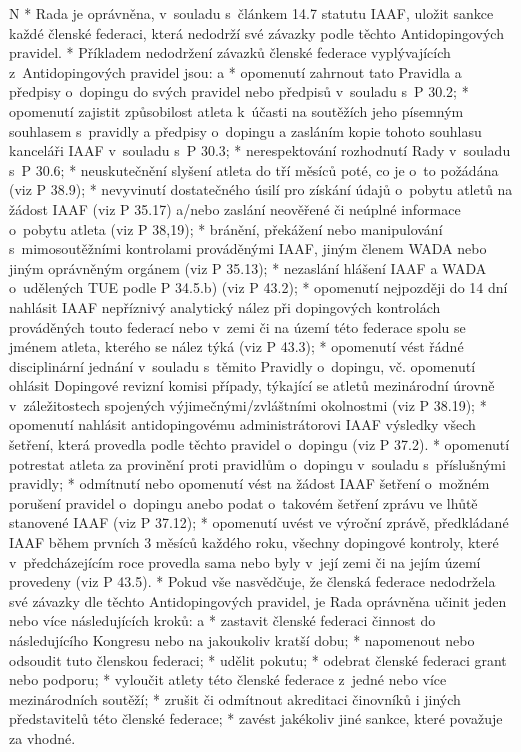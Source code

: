 \begitems \style N
* Rada je oprávněna, v~souladu s~článkem 14.7 statutu IAAF, uložit sankce každé členské federaci, která nedodrží své závazky podle těchto Antidopingových pravidel.
* Příkladem nedodržení závazků členské federace vyplývajících z~Antidopingových pravidel jsou:
  \begitems \style a
  * opomenutí zahrnout tato Pravidla a předpisy o~dopingu do svých pravidel nebo předpisů v~souladu s~P 30.2;
  * opomenutí zajistit způsobilost atleta k~účasti na soutěžích jeho písemným souhlasem s~pravidly a předpisy o~dopingu a zasláním kopie tohoto souhlasu kanceláři IAAF v~souladu s~P 30.3;
  * nerespektování rozhodnutí Rady v~souladu s~P 30.6;
  * neuskutečnění slyšení atleta do tří měsíců poté, co je o~to požádána (viz P 38.9);
  * nevyvinutí dostatečného úsilí pro získání údajů o~pobytu atletů na žádost IAAF (viz P 35.17) a/nebo zaslání neověřené či neúplné informace o~pobytu atleta (viz P 38,19);
  * bránění, překážení nebo manipulování s~mimosoutěžními kontrolami prováděnými IAAF, jiným členem WADA nebo jiným oprávněným orgánem (viz P 35.13);
  * nezaslání hlášení IAAF a WADA o~udělených TUE podle P 34.5.b) (viz P 43.2);
  * opomenutí nejpozději do 14 dní nahlásit IAAF nepříznivý analytický nález při dopingových kontrolách prováděných touto federací nebo v~zemi či na území této federace spolu se jménem atleta, kterého se nález týká (viz P 43.3);
  * opomenutí vést řádné disciplinární jednání v~souladu s~těmito Pravidly o~dopingu, vč. opomenutí ohlásit Dopingové revizní komisi případy, týkající se atletů mezinárodní úrovně v~záležitostech spojených výjimečnými/zvláštními okolnostmi (viz P 38.19);
  * opomenutí nahlásit antidopingovému administrátorovi IAAF výsledky všech šetření, která provedla podle těchto pravidel o~dopingu (viz P 37.2).
  * opomenutí potrestat atleta za provinění proti pravidlům o~dopingu v~souladu s~příslušnými pravidly;
  * odmítnutí nebo opomenutí vést na žádost IAAF šetření o~možném porušení pravidel o~dopingu anebo podat o~takovém šetření zprávu ve lhůtě stanovené IAAF (viz P 37.12);
  * opomenutí uvést ve výroční zprávě, předkládané IAAF během prvních 3 měsíců každého roku, všechny dopingové kontroly, které v~předcházejícím roce provedla sama nebo byly v~její zemi či na jejím území provedeny (viz P 43.5).
  \enditems
* Pokud vše nasvědčuje, že členská federace nedodržela své závazky dle těchto Antidopingových pravidel, je Rada oprávněna učinit jeden nebo více následujících kroků:
  \begitems \style a
  * zastavit členské federaci činnost do následujícího Kongresu nebo na jakoukoliv kratší dobu;
  * napomenout nebo odsoudit tuto členskou federaci;
  * udělit pokutu;
  * odebrat členské federaci grant nebo podporu;
  * vyloučit atlety této členské federace z~jedné nebo více mezinárodních soutěží;
  * zrušit či odmítnout akreditaci činovníků i jiných představitelů této členské federace;
  * zavést jakékoliv jiné sankce, které považuje za vhodné.
  \enditems

